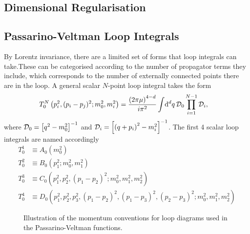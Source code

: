 \documentclass[../main.tex]{subfiles}
\begin{document}
\subsection{Dimensional Regularisation}




\subsection{Passarino-Veltman Loop Integrals}
\label{qft:subsec:pave}
By Lorentz invariance, there are a limited set of forms that loop integrals
can
take. These can be categorised according to the number
of propagator terms they include, which corresponds to the number of externally
connected points there are in the loop. A general scalar \(N\)-point loop
integral takes the form
\begin{align}
  T^N_0\left(p_i^2, (p_i-p_j)^2; m_0^2, m_i^2\right) & = \frac{\left(2\pi
      \mu\right)^{4-d}}{i \pi^2} \int \!\mathrm{d}^d q\, \mathcal{D}_0
  \prod_{i=1}^{N-1}
  \mathcal{D}_i,
\end{align}
where \(\mathcal{D}_0 = \left[q^2-m_0^2\right]^{-1}\) and \(\mathcal{D}_i =
\left[\left(q+p_i\right)^2-m_i^2\right]^{-1}\).
The first 4 scalar loop integrals are named accordingly
\begin{align}
  T^1_0 & \equiv A_0(m_0^2)
  \\
  T^2_0 & \equiv B_0(p_1^2; m_0^2, m_1^2)
  \\
  T^3_0 & \equiv C_0(p_1^2, p_2^2, (p_1-p_2)^2; m_0^2, m_1^2, m_2^2)
  \\
  T^4_0 & \equiv D_0(p_1^2, p_2^2, p_3^2, (p_1-p_2)^2, (p_1-p_3)^2,
  (p_2-p_3)^2; m_0^2, m_1^2, m_2^2)
\end{align}

\begin{figure}[ht!]
  \centering
  \begin{subfigure}{0.49\linewidth}
    \centering
    \caption{}
    \label{qft:fig:PV_triloop_conventions}
  \end{subfigure}
  \begin{subfigure}{0.49\linewidth}
    \centering
    \caption{}
    \label{qft:fig:PV_boxloop_conventions}
  \end{subfigure}
  \caption{Illustration of the momentum conventions for loop diagrams used in
    the Passarino-Veltman functions.}
  \label{qft:fig:PV_loop_conventions}
\end{figure}
\end{document}
